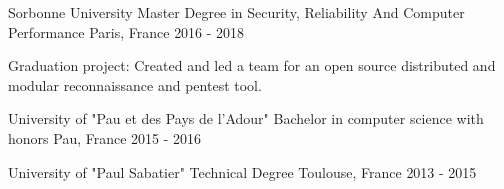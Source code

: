 

\begin{cventries}

  \cventry
    {Sorbonne University} %
    {Master Degree in Security, Reliability And Computer Performance } %
    {Paris, France} %
    {2016 - 2018} %
    {
      \begin{cvitems} %
        \item {Graduation project: Created and led a team for an open source distributed and modular reconnaissance and pentest tool.}
      \end{cvitems}
    }

  \cventry
    {University of "Pau et des Pays de l'Adour"} %
    {Bachelor in computer science with honors } %
    {Pau, France} %
    {2015 - 2016} %
    {
      \begin{cvitems}
      \end{cvitems}
    }

  \cventry
    {University of "Paul Sabatier"} %
    {Technical Degree} %
    {Toulouse, France} %
    {2013 - 2015} %
    {}

\end{cventries}

